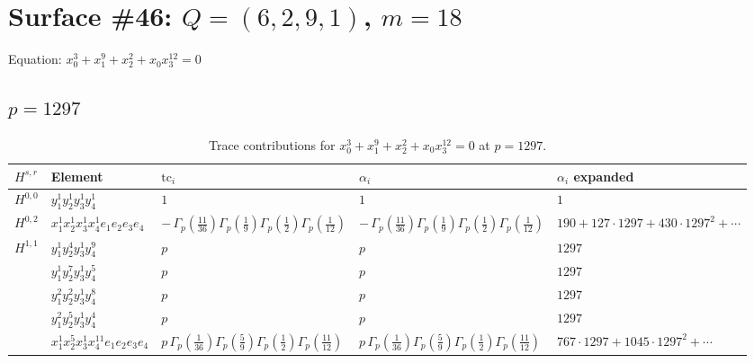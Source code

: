 \documentclass[11pt]{article}
\begin{document}
\newpage

\section*{Surface \#46: $Q=(6, 2, 9, 1)$, $m=18$}

Equation: $x_0^{3} + x_1^{9} + x_2^{2} + x_0 x_3^{12} = 0$

\subsection*{$p = 1297$}

\begin{table}[ht]
\centering
\caption{Trace contributions for $x_0^{3} + x_1^{9} + x_2^{2} + x_0 x_3^{12} = 0$ at $p=1297$.}\label{tab:deformed-46}
\renewcommand{\arraystretch}{1.1}
{\scriptsize
\begin{tabular}{@{}lllll@{}}
\toprule
$H^{s,r}$ & Element & $\mathrm{tc}_i$ & $\alpha_i$ & $\alpha_i$ expanded \\
\midrule
$H^{0,0}$ & $y_{1}^{1} y_{2}^{1} y_{3}^{1} y_{4}^{1}$ & $1$ & $1$ & $1$ \\
\midrule
$H^{0,2}$ & $x_{1}^{1} x_{2}^{1} x_{3}^{1} x_{4}^{1}  e_{1} e_{2} e_{3} e_{4}$ & $- \, \Gamma_p \left( \frac{11}{36} \right) \Gamma_p \left( \frac{1}{9} \right) \Gamma_p \left( \frac{1}{2} \right) \Gamma_p \left( \frac{1}{12} \right)$ & $- \, \Gamma_p \left( \frac{11}{36} \right) \Gamma_p \left( \frac{1}{9} \right) \Gamma_p \left( \frac{1}{2} \right) \Gamma_p \left( \frac{1}{12} \right)$ & $190{+}127{\cdot}1297{+}430{\cdot}1297^{2}{+}\cdots$ \\
\midrule
$H^{1,1}$ & $y_{1}^{1} y_{2}^{4} y_{3}^{1} y_{4}^{9}$ & $p \,$ & $p \,$ & $1297$ \\
 & $y_{1}^{1} y_{2}^{7} y_{3}^{1} y_{4}^{5}$ & $p \,$ & $p \,$ & $1297$ \\
 & $y_{1}^{2} y_{2}^{2} y_{3}^{1} y_{4}^{8}$ & $p \,$ & $p \,$ & $1297$ \\
 & $y_{1}^{2} y_{2}^{5} y_{3}^{1} y_{4}^{4}$ & $p \,$ & $p \,$ & $1297$ \\
 & $x_{1}^{1} x_{2}^{5} x_{3}^{1} x_{4}^{11}  e_{1} e_{2} e_{3} e_{4}$ & $p \, \Gamma_p \left( \frac{1}{36} \right) \Gamma_p \left( \frac{5}{9} \right) \Gamma_p \left( \frac{1}{2} \right) \Gamma_p \left( \frac{11}{12} \right)$ & $p \, \Gamma_p \left( \frac{1}{36} \right) \Gamma_p \left( \frac{5}{9} \right) \Gamma_p \left( \frac{1}{2} \right) \Gamma_p \left( \frac{11}{12} \right)$ & $767{\cdot}1297{+}1045{\cdot}1297^{2}{+}\cdots$ \\

\end{tabular}}
\end{table}
\end{document}
